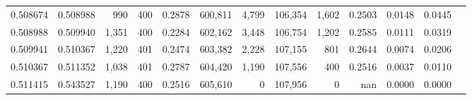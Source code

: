 \begin{tabular}{rrrrrrrrrrrrr}
0.508674 & 0.508988 &   990 & 400 &                                     0.2878 & 600,811 &   4,799 & 106,354 &   1,602 & 0.2503 & 0.0148 & 0.0445 \\
0.508988 & 0.509940 & 1,351 & 400 &                                     0.2284 & 602,162 &   3,448 & 106,754 &   1,202 & 0.2585 & 0.0111 & 0.0319 \\
0.509941 & 0.510367 & 1,220 & 401 &                                     0.2474 & 603,382 &   2,228 & 107,155 &     801 & 0.2644 & 0.0074 & 0.0206 \\
0.510367 & 0.511352 & 1,038 & 401 &                                     0.2787 & 604,420 &   1,190 & 107,556 &     400 & 0.2516 & 0.0037 & 0.0110 \\
0.511415 & 0.543527 & 1,190 & 400 &                                     0.2516 & 605,610 &       0 & 107,956 &       0 &    nan & 0.0000 & 0.0000 \\
\bottomrule
\end{tabular}
